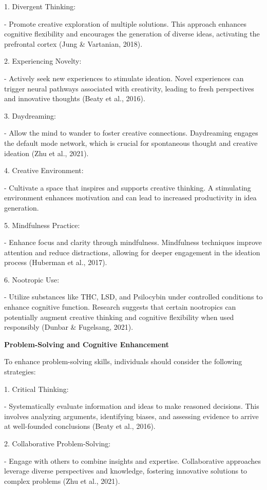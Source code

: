 \documentclass[
]{article}
\begin{document}
1. Divergent Thinking:

- Promote creative exploration of multiple solutions. This approach
enhances cognitive flexibility and encourages the generation of diverse
ideas, activating the prefrontal cortex (Jung \& Vartanian, 2018).

2. Experiencing Novelty:

- Actively seek new experiences to stimulate ideation. Novel experiences
can trigger neural pathways associated with creativity, leading to fresh
perspectives and innovative thoughts (Beaty et al., 2016).

3. Daydreaming:

- Allow the mind to wander to foster creative connections. Daydreaming
engages the default mode network, which is crucial for spontaneous
thought and creative ideation (Zhu et al., 2021).

4. Creative Environment:

- Cultivate a space that inspires and supports creative thinking. A
stimulating environment enhances motivation and can lead to increased
productivity in idea generation.

5. Mindfulness Practice:

- Enhance focus and clarity through mindfulness. Mindfulness techniques
improve attention and reduce distractions, allowing for deeper
engagement in the ideation process (Huberman et al., 2017).

6. Nootropic Use:

- Utilize substances like THC, LSD, and Psilocybin under controlled
conditions to enhance cognitive function. Research suggests that certain
nootropics can potentially augment creative thinking and cognitive
flexibility when used responsibly (Dunbar \& Fugelsang, 2021).

\textbf{Problem-Solving and Cognitive Enhancement}

To enhance problem-solving skills, individuals should consider the
following strategies:

1. Critical Thinking:

- Systematically evaluate information and ideas to make reasoned
decisions. This involves analyzing arguments, identifying biases, and
assessing evidence to arrive at well-founded conclusions (Beaty et al.,
2016).

2. Collaborative Problem-Solving:

- Engage with others to combine insights and expertise. Collaborative
approaches leverage diverse perspectives and knowledge, fostering
innovative solutions to complex problems (Zhu et al., 2021).
\end{document}
